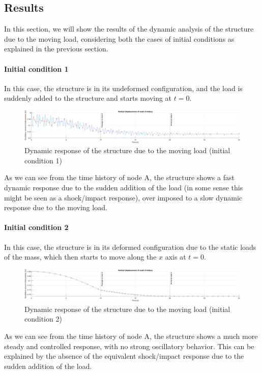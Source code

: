 \subsection{Results}
\label{subsec:results}

In this section, we will show the results of the dynamic analysis of the structure due to the moving load, considering both the cases of initial conditions as explained in the previous section.

\paragraph{Initial condition 1}

In this case, the structure is in its undeformed configuration, and the load is suddenly added to the structure and starts moving at $t = 0$.

\begin{figure}[H]
    \centering
    \includegraphics[width=\textwidth]{img/MATLAB/Responses/Moving_load_history_condition_1.png}
    \caption{Dynamic response of the structure due to the moving load (initial condition 1)}
    \label{fig:moving_loads_response_initial_condition_1}
\end{figure}

As we can see from the time history of node A, the structure shows a fast dynamic response due to the sudden addition of the load (in some sense this might be seen as a shock/impact response), over imposed to a slow dynamic response due to the moving load.

\paragraph{Initial condition 2}

In this case, the structure is in its deformed configuration due to the static loads of the mass, which then starts to move along the $x$ axis at $t = 0$.

\begin{figure}[H]
    \centering
    \includegraphics[width=\textwidth]{img/MATLAB/Responses/Moving_load_history_condition_2.png}
    \caption{Dynamic response of the structure due to the moving load (initial condition 2)}
    \label{fig:moving_loads_response_initial_condition_2}
\end{figure}

As we can see from the time history of node A, the structure shows a much more steady and controlled response, with no strong oscillatory behavior.
This can be explained by the absence of the equivalent shock/impact response due to the sudden addition of the load.
